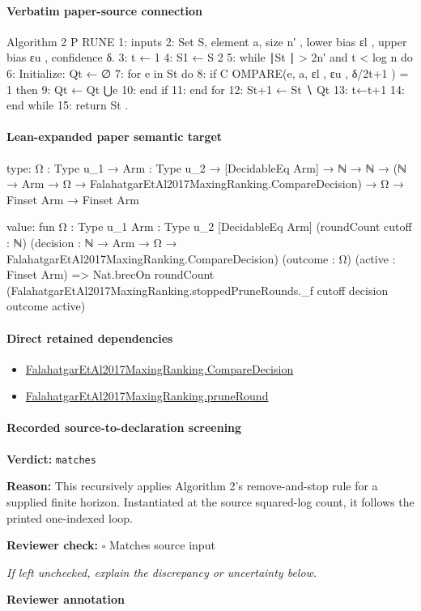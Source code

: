 \documentclass[10pt]{article}
\newcommand{\reviewerbox}{%
  \par\noindent\fbox{\parbox{0.96\linewidth}{\rule{0pt}{0.38in}}}\par
}
\newcommand{\reviewmatch}[1]{%
  \par\noindent\textbf{Reviewer check:} $\square$\; #1\par
  \noindent\emph{If left unchecked, explain the discrepancy or uncertainty below.}\par
}
\begin{document}
\paragraph{Verbatim paper-source connection}
\begin{ReviewVerbatim}
Algorithm 2 P RUNE
 1: inputs
 2:   Set S, element a, size n′ , lower bias εl , upper bias εu , confidence δ.
 3: t ← 1
 4: S1 ← S
                                   2
 5: while ∣St ∣ > 2n′ and t < log n do
 6:   Initialize: Qt ← ∅
 7:   for e in St do
 8:      if C OMPARE(e, a, εl , εu , δ/2t+1 ) = 1 then
 9:         Qt ← Qt ⋃{e}
10:      end if
11:   end for
12:   St+1 ← St ∖ Qt
13:   t←t+1
14: end while
15: return St .
\end{ReviewVerbatim}



\paragraph{Lean-expanded paper semantic target}
\begin{ReviewVerbatim}
type:
{Ω : Type u_1} →
  {Arm : Type u_2} →
    [DecidableEq Arm] →
      ℕ → ℕ → (ℕ → Arm → Ω → FalahatgarEtAl2017MaxingRanking.CompareDecision) → Ω → Finset Arm → Finset Arm

value:
fun {Ω : Type u_1} {Arm : Type u_2} [DecidableEq Arm] (roundCount cutoff : ℕ)
    (decision : ℕ → Arm → Ω → FalahatgarEtAl2017MaxingRanking.CompareDecision) (outcome : Ω) (active : Finset Arm) =>
  Nat.brecOn roundCount (FalahatgarEtAl2017MaxingRanking.stoppedPruneRounds._f cutoff decision outcome active)
\end{ReviewVerbatim}

\paragraph{Direct retained dependencies}
\begin{itemize}\raggedright
\item \hyperlink{governing-declaration-3723216c72fc3dc8}{Falahatgar\allowbreak{}Et\allowbreak{}Al2017\allowbreak{}Maxing\allowbreak{}Ranking.\allowbreak{}Compare\allowbreak{}Decision}
\item \hyperlink{governing-declaration-d3d8824237f88f4d}{Falahatgar\allowbreak{}Et\allowbreak{}Al2017\allowbreak{}Maxing\allowbreak{}Ranking.\allowbreak{}prune\allowbreak{}Round}
\end{itemize}
\paragraph{Recorded source-to-declaration screening}
\textbf{Verdict:} \texttt{matches}
\\
{\raggedright
\textbf{Reason:} This recursively applies Algorithm 2's remove-\allowbreak{}and-\allowbreak{}stop rule for a supplied finite horizon.\allowbreak{} Instantiated at the source squared-\allowbreak{}log count, it follows the printed one-\allowbreak{}indexed loop.\allowbreak{}
\par}
\reviewmatch{Matches source input}
\noindent\textbf{Reviewer annotation}\par
\reviewerbox
\clearpage
\hypertarget{paper-prerequisite-e5f298067b73797f}{}
\end{document}
